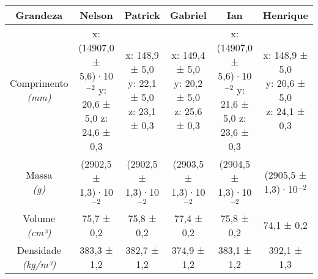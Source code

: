 \documentclass{article}
\begin{document}
\begin{table}[h!]
\centering
\begin{tabular}{c c c c c c }
\toprule
Grandeza & Nelson & Patrick & Gabriel & Ian & Henrique\\
\midrule
\shortstack{Comprimento\\\textit{(mm)}} & \shortstack{x: (14907,0 ± 5,6)·10$^{-2}$\\y: 20,6 ± 5,0\\z: 24,6 ± 0,3} & \shortstack{x: 148,9 ± 5,0\\y: 22,1 ± 5,0\\z: 23,1 ± 0,3} & \shortstack{x: 149,4 ± 5,0\\y: 20,2 ± 5,0\\z: 25,6 ± 0,3} & \shortstack{x: (14907,0 ± 5,6)·10$^{-2}$\\y: 21,6 ± 5,0\\z: 23,6 ± 0,3} & \shortstack{x: 148,9 ± 5,0\\y: 20,6 ± 5,0\\z: 24,1 ± 0,3}\\[4pt]
\shortstack{Massa\\\textit{(g)}} & (2902,5 ± 1,3)·10$^{-2}$ & (2902,5 ± 1,3)·10$^{-2}$ & (2903,5 ± 1,3)·10$^{-2}$ & (2904,5 ± 1,3)·10$^{-2}$ & (2905,5 ± 1,3)·10$^{-2}$\\[4pt]
\shortstack{Volume\\\textit{(cm³)}} & 75,7 ± 0,2 & 75,8 ± 0,2 & 77,4 ± 0,2 & 75,8 ± 0,2 & 74,1 ± 0,2\\[4pt]
\shortstack{Densidade\\\textit{(kg/m³)}} & 383,3 ± 1,2 & 382,7 ± 1,2 & 374,9 ± 1,2 & 383,1 ± 1,2 & 392,1 ± 1,3\\[4pt]
\bottomrule
\end{tabular}
\end{table}
\end{document}
